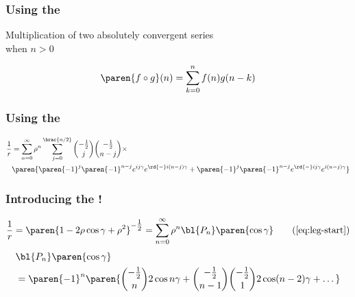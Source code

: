 %
\begin{frame}\frametitle{Using the \cauchyProductMathworld}

\begin{center}
	Multiplication of two absolutely convergent series \\
	when $n>0$
\end{center}
\begin{equation*}
	\paren{f \circ g}(n) = \sum_{k=0}^{n} f(n)g(n-k)
\end{equation*}
\end{frame}

\begin{frame}\frametitle{Using the \cauchyProductWikipedia}
\begin{equation*}
\begin{split}
		\displaystyle\frac{1}{r} &= \displaystyle\sum_{n=0}^{\infty} \rho^{n} \displaystyle\sum_{j=0}^{\brac{n/2}} 
			\binom{-\tfrac{1}{2}}{j} \binom{-\tfrac{1}{2}}{n-j} \times \\
			& \paren{
				\paren{-1}^{j} \paren{-1}^{n-j} e^{ij\gamma}e^{\rd{-}i(n-j)\gamma}
				+ \paren{-1}^{j} \paren{-1}^{n-j} e^{\rd{-}ij\gamma}e^{i(n-j)\gamma}
			}
\end{split}
\end{equation*}
\end{frame}

%
\begin{frame}\frametitle{Introducing the \legendremathworld!\jumpLittle}
\begin{equation}
	\frac{1}{r} = \paren{1 - 2\rho \cos \gamma + \rho^{2}}^{-\tfrac{1}{2}} = \displaystyle\sum_{n=0}^{\infty} \rho^{n} \bl{P_{n}}\paren{\cos \gamma}
\tag{\ref{eq:leg-start}}
\end{equation}
\pause
\begin{equation*}
\begin{split}
	&\bl{P_{n}}\paren{\cos \gamma} \\
		&= \paren{-1}^{n} \paren{\binom{-\tfrac{1}{2}}{n} 2 \cos n \gamma + \binom{-\tfrac{1}{2}}{n-1} \binom{-\tfrac{1}{2}}{1}  2 \cos (n-2) \gamma + \dots}
\end{split}
\end{equation*}
\end{frame}
%



